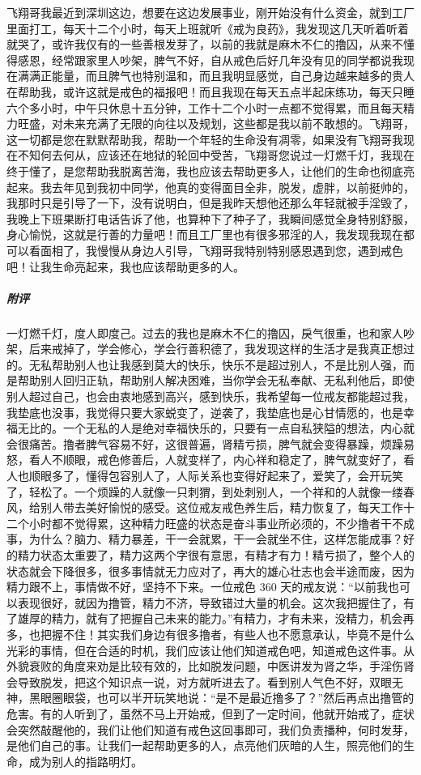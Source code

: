 \begin{case}
    飞翔哥我最近到深圳这边，想要在这边发展事业，刚开始没有什么资金，就到工厂里面打工，每天十二个小时，每天上班就听《戒为良药》，我发现这几天听着听着就哭了，或许我仅有的一些善根发芽了，以前的我就是麻木不仁的撸囚，从来不懂得感恩，经常跟家里人吵架，脾气不好，自从戒色后好几年没有见的同学都说我现在满满正能量，而且脾气也特别温和，而且我明显感觉，自己身边越来越多的贵人在帮助我，或许这就是戒色的福报吧！而且我现在每天五点半起床练功，每天只睡六个多小时，中午只休息十五分钟，工作十二个小时一点都不觉得累，而且每天精力旺盛，对未来充满了无限的向往以及规划，这些都是我以前不敢想的。飞翔哥，这一切都是您在默默帮助我，帮助一个年轻的生命没有凋零，如果没有飞翔哥我现在不知何去何从，应该还在地狱的轮回中受苦，飞翔哥您说过一灯燃千灯，我现在终于懂了，是您帮助我脱离苦海，我也应该去帮助更多人，让他们的生命也彻底亮起来。我去年见到我初中同学，他真的变得面目全非，脱发，虚胖，以前挺帅的，我那时只是引导了一下，没有说明白，但是我昨天想他还那么年轻就被手淫毁了，我晚上下班果断打电话告诉了他，也算种下了种子了，我瞬间感觉全身特别舒服，身心愉悦，这就是行善的力量吧！而且工厂里也有很多邪淫的人，我发现我现在都可以看面相了，我慢慢从身边人引导，飞翔哥我特别特别感恩遇到您，遇到戒色吧！让我生命亮起来，我也应该帮助更多的人。
    \subparagraph{附评} 一灯燃千灯，度人即度己。过去的我也是麻木不仁的撸囚，戾气很重，也和家人吵架，后来戒掉了，学会修心，学会行善积德了，我发现这样的生活才是我真正想过的。无私帮助别人也让我感到莫大的快乐，快乐不是超过别人，不是比别人强，而是帮助别人回归正轨，帮助别人解决困难，当你学会无私奉献、无私利他后，即使别人超过自己，也会由衷地感到高兴，感到快乐，我希望每一位戒友都能超过我，我垫底也没事，我觉得只要大家蜕变了，逆袭了，我垫底也是心甘情愿的，也是幸福无比的。一个无私的人是绝对幸福快乐的，只要有一点自私狭隘的想法，内心就会很痛苦。撸者脾气容易不好，这很普遍，肾精亏损，脾气就会变得暴躁，烦躁易怒，看人不顺眼，戒色修善后，人就变样了，内心祥和稳定了，脾气就变好了，看人也顺眼多了，懂得包容别人了，人际关系也变得好起来了，爱笑了，会开玩笑了，轻松了。一个烦躁的人就像一只刺猬，到处刺别人，一个祥和的人就像一缕春风，给别人带去美好愉悦的感受。这位戒友戒色养生后，精力恢复了，每天工作十二个小时都不觉得累，这种精力旺盛的状态是奋斗事业所必须的，不少撸者干不成事，为什么？脑力、精力暴差，干一会就累，干一会就坐不住，这样怎能成事？好的精力状态太重要了，精力这两个字很有意思，有精才有力！精亏损了，整个人的状态就会下降很多，很多事情就无力应对了，再大的雄心壮志也会半途而废，因为精力跟不上，事情做不好，坚持不下来。一位戒色 360 天的戒友说：“以前我也可以表现很好，就因为撸管，精力不济，导致错过大量的机会。这次我把握住了，有了雄厚的精力，就有了把握自己未来的能力。”有精力，才有未来，没精力，机会再多，也把握不住！其实我们身边有很多撸者，有些人也不愿意承认，毕竟不是什么光彩的事情，但在合适的时机，我们应该让他们知道戒色吧，知道戒色这件事。从外貌衰败的角度来劝是比较有效的，比如脱发问题，中医讲发为肾之华，手淫伤肾会导致脱发，把这个知识点一说，对方就听进去了。看到别人气色不好，双眼无神，黑眼圈眼袋，也可以半开玩笑地说：“是不是最近撸多了？”然后再点出撸管的危害。有的人听到了，虽然不马上开始戒，但到了一定时间，他就开始戒了，症状会突然敲醒他的，我们让他们知道有戒色这回事即可，我们负责播种，何时发芽，是他们自己的事。让我们一起帮助更多的人，点亮他们灰暗的人生，照亮他们的生命，成为别人的指路明灯。
\end{case}

